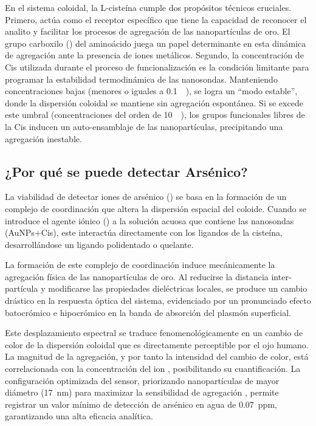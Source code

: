 En el sistema coloidal, la L-cisteína cumple dos propósitos técnicos cruciales.
Primero, actúa como el receptor específico que tiene la capacidad de reconocer
el analito y facilitar los procesos de agregación de las nanopartículas de oro.
El grupo carboxilo () del aminoácido juega un papel determinante en esta
dinámica de agregación ante la presencia de iones metálicos. Segundo, la
concentración de Cis utilizada durante el proceso de funcionalización es la
condición limitante para programar la estabilidad termodinámica de las
nanosondas. Manteniendo concentraciones bajas (menores o iguales a
\qty{0.1}{\milli\molar}), se logra un ``modo estable'', donde la dispersión
coloidal se mantiene sin agregación espontánea. Si se excede este umbral
(concentraciones del orden de \qty{10}{\milli\molar}), los grupos funcionales
libres de la Cis inducen un auto-ensamblaje de las nanopartículas, precipitando
una agregación inestable.

\subsection{¿Por qué se puede detectar Arsénico?}

La viabilidad de detectar iones de arsénico () se basa en la formación
de un complejo de coordinación que altera la dispersión espacial del coloide.
Cuando se introduce el agente iónico () a la solución acuosa que
contiene las nanosondas (AuNPs+Cis), este interactúa directamente con los
ligandos de la cisteína, desarrollándose un ligando polidentado o quelante.

La formación de este complejo de coordinación induce mecánicamente la agregación
física de las nanopartículas de oro. Al reducirse la distancia inter-partícula y
modificarse las propiedades dieléctricas locales, se produce un cambio drástico
en la respuesta óptica del sistema, evidenciado por un pronunciado efecto
batocrómico e hipocrómico en la banda de absorción del plasmón superficial.

Este desplazamiento espectral se traduce fenomenológicamente en un cambio de
color de la dispersión coloidal que es directamente perceptible por el ojo
humano. La magnitud de la agregación, y por tanto la intensidad del cambio de
color, está correlacionada con la concentración del ion , posibilitando
su cuantificación. La configuración optimizada del sensor, priorizando
nanopartículas de mayor diámetro (\qty{17}{\nano\metre}) para maximizar la sensibilidad de
agregación , permite registrar un valor mínimo de detección de arsénico en agua
de \qty{0.07}{ppm}, garantizando una alta eficacia analítica.
